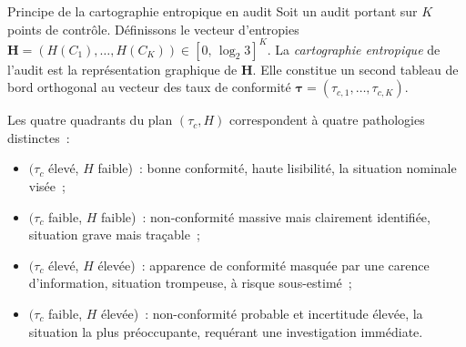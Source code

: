 \begin{boiteTheoreme}{Principe de la cartographie entropique en audit}
Soit un audit portant sur $K$ points de contrôle. Définissons le vecteur
d'entropies $\mathbf{H} = (H(C_1), \ldots, H(C_K)) \in [0,\,\log_2 3]^K$.
La \emph{cartographie entropique} de l'audit est la représentation graphique de
$\mathbf{H}$. Elle constitue un second tableau de bord orthogonal au vecteur des
taux de conformité $\boldsymbol{\tau} = (\tau_{c,1}, \ldots, \tau_{c,K})$.

Les quatre quadrants du plan $(\tau_c, H)$ correspondent à quatre pathologies
distinctes~:
\begin{itemize}
  \item $(\tau_c$ élevé, $H$ faible)~: bonne conformité, haute lisibilité,
        la situation nominale visée~;
  \item $(\tau_c$ faible, $H$ faible)~: non-conformité massive mais clairement
        identifiée, situation grave mais traçable~;
  \item $(\tau_c$ élevé, $H$ élevée)~: apparence de conformité masquée par une
        carence d'information, situation trompeuse, à risque sous-estimé~;
  \item $(\tau_c$ faible, $H$ élevée)~: non-conformité probable et incertitude
        élevée, la situation la plus préoccupante, requérant une investigation
        immédiate.
\end{itemize}
\end{boiteTheoreme}

